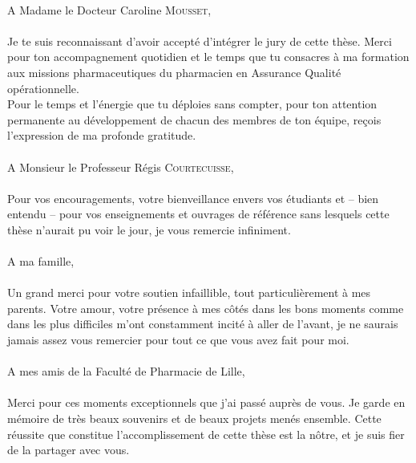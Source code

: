 {{{\paragraph*{}
A Madame le Docteur Caroline \textsc{Mousset},
\paragraph*{}
Je te suis reconnaissant d'avoir accept\'{e} d'int\'{e}grer le jury de cette th\`{e}se. Merci pour ton accompagnement quotidien et le temps que tu consacres \`{a} ma formation aux missions pharmaceutiques du pharmacien en Assurance Qualit\'{e} op\'{e}rationnelle. \\
Pour le temps et l'\'{e}nergie que tu d\'{e}ploies sans compter, pour ton attention permanente au d\'{e}veloppement de chacun des membres de ton \'{e}quipe, re\c{c}ois l'expression de ma profonde gratitude.
\vspace{5mm}
\paragraph*{}
A Monsieur le Professeur R\'{e}gis \textsc{Courtecuisse},
\paragraph*{}
Pour vos encouragements, votre bienveillance envers vos \'{e}tudiants et -- bien entendu -- pour vos enseignements et ouvrages de r\'{e}f\'{e}rence sans lesquels cette th\`{e}se n'aurait pu voir le jour, je vous remercie infiniment.
\cleardoublepage
\paragraph*{}
A ma famille,
\paragraph*{}
Un grand merci pour votre soutien infaillible, tout particuli\`{e}rement \`{a} mes parents. Votre amour, votre pr\'{e}sence \`{a} mes c\^ {o}t\'{e}s dans les bons moments comme dans les plus difficiles m'ont constamment incit\'{e} \`{a} aller de l'avant, je ne saurais jamais assez vous remercier pour tout ce que vous avez fait pour moi.
\vspace{5mm}
\paragraph*{}
A mes amis de la Facult\'{e} de Pharmacie de Lille,
\paragraph*{}
Merci pour ces moments exceptionnels que j'ai pass\'{e} aupr\`{e}s de vous. Je garde en m\'{e}moire de tr\`{e}s beaux souvenirs et de beaux projets men\'{e}s ensemble. Cette r\'{e}ussite que constitue l'accomplissement de cette th\`{e}se est la n\^ {o}tre, et je suis fier de la partager avec vous.
}}}

